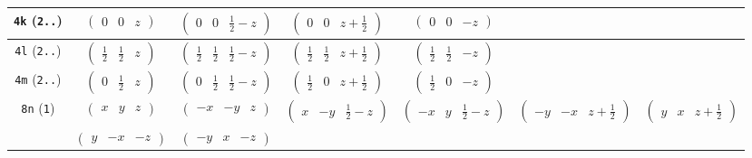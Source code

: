 \documentclass[fleqn,9pt,landscape]{jsarticle}
\begin{document}
\begin{center}
\begin{longtable}{ccccccc}
{\tt 4k} ({\tt 2..}) & $ \begin{pmatrix} 0 & 0 & z \end{pmatrix} $ & $ \begin{pmatrix} 0 & 0 & \frac{1}{2} - z \end{pmatrix} $ & $ \begin{pmatrix} 0 & 0 & z + \frac{1}{2} \end{pmatrix} $ & $ \begin{pmatrix} 0 & 0 & - z \end{pmatrix} $ & $  $ & $  $ \\ \hline
{\tt 4l} ({\tt 2..}) & $ \begin{pmatrix} \frac{1}{2} & \frac{1}{2} & z \end{pmatrix} $ & $ \begin{pmatrix} \frac{1}{2} & \frac{1}{2} & \frac{1}{2} - z \end{pmatrix} $ & $ \begin{pmatrix} \frac{1}{2} & \frac{1}{2} & z + \frac{1}{2} \end{pmatrix} $ & $ \begin{pmatrix} \frac{1}{2} & \frac{1}{2} & - z \end{pmatrix} $ & $  $ & $  $ \\ \hline
{\tt 4m} ({\tt 2..}) & $ \begin{pmatrix} 0 & \frac{1}{2} & z \end{pmatrix} $ & $ \begin{pmatrix} 0 & \frac{1}{2} & \frac{1}{2} - z \end{pmatrix} $ & $ \begin{pmatrix} \frac{1}{2} & 0 & z + \frac{1}{2} \end{pmatrix} $ & $ \begin{pmatrix} \frac{1}{2} & 0 & - z \end{pmatrix} $ & $  $ & $  $ \\ \hline
{\tt 8n} ({\tt 1}) & $ \begin{pmatrix} x & y & z \end{pmatrix} $ & $ \begin{pmatrix} - x & - y & z \end{pmatrix} $ & $ \begin{pmatrix} x & - y & \frac{1}{2} - z \end{pmatrix} $ & $ \begin{pmatrix} - x & y & \frac{1}{2} - z \end{pmatrix} $ & $ \begin{pmatrix} - y & - x & z + \frac{1}{2} \end{pmatrix} $ & $ \begin{pmatrix} y & x & z + \frac{1}{2} \end{pmatrix} $ \\
& $ \begin{pmatrix} y & - x & - z \end{pmatrix} $ & $ \begin{pmatrix} - y & x & - z \end{pmatrix} $ & $  $ & $  $ & $  $ & $  $ \\
\end{longtable}
\end{center}
\end{document}
